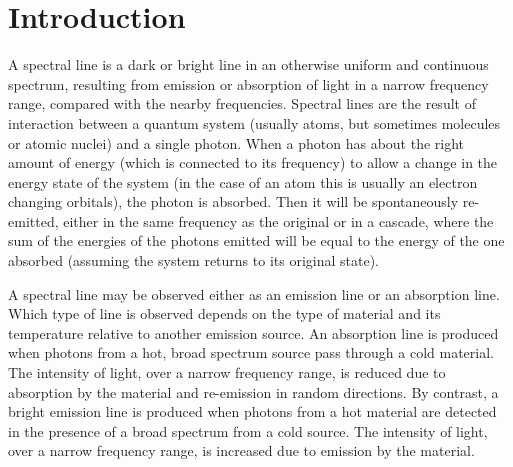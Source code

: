 \documentclass[%
 reprint,
nofootinbib,
 amsmath,amssymb,
 aps,
floatfix,
]{revtex4-2}
\begin{document}
\section{\label{sec:level1}Introduction}
    A spectral line is a dark or bright line in an otherwise uniform and continuous spectrum, resulting from emission or absorption of light in a narrow frequency range, compared with the nearby frequencies. Spectral lines are the result of interaction between a quantum system (usually atoms, but sometimes molecules or atomic nuclei) and a single photon. When a photon has about the right amount of energy (which is connected to its frequency) to allow a change in the energy state of the system (in the case of an atom this is usually an electron changing orbitals), the photon is absorbed. Then it will be spontaneously re-emitted, either in the same frequency as the original or in a cascade, where the sum of the energies of the photons emitted will be equal to the energy of the one absorbed (assuming the system returns to its original state).
    \par
    A spectral line may be observed either as an emission line or an absorption line. Which type of line is observed depends on the type of material and its temperature relative to another emission source. An absorption line is produced when photons from a hot, broad spectrum source pass through a cold material. The intensity of light, over a narrow frequency range, is reduced due to absorption by the material and re-emission in random directions. By contrast, a bright emission line is produced when photons from a hot material are detected in the presence of a broad spectrum from a cold source. The intensity of light, over a narrow frequency range, is increased due to emission by the material.
\end{document}
